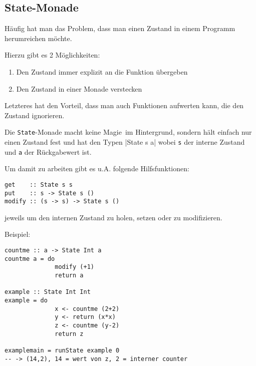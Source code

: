 \documentclass{beamer}
\begin{document}
\subsection{State-Monade}
\begin{frame}[fragile]
Häufig hat man das Problem, dass man einen Zustand in einem Programm herumreichen möchte.\bigskip

\pause
Hierzu gibt es 2 Möglichkeiten:
\begin{enumerate}
 \item Den Zustand immer explizit an die Funktion übergeben
 \item Den Zustand in einer Monade verstecken
\end{enumerate}
\pause
Letzteres hat den Vorteil, dass man auch Funktionen aufwerten kann, die den Zustand ignorieren.
\end{frame}

\begin{frame}[fragile]
Die \texttt{State}-Monade macht keine \glqq Magie\grqq \ im Hintergrund, sondern hält einfach nur einen Zustand fest und hat den Typen
|State s a|
wobei \texttt{s} der interne Zustand und \texttt{a} der Rückgabewert ist.\bigskip

\pause
Um damit zu arbeiten gibt es u.A. folgende Hilfsfunktionen:
\begin{verbatim}
get    :: State s s
put    :: s -> State s ()
modify :: (s -> s) -> State s ()
\end{verbatim}
jeweils um den internen Zustand zu holen, setzen oder zu modifizieren.
\end{frame}

\begin{frame}[fragile]
Beispiel:
\begin{verbatim}
countme :: a -> State Int a
countme a = do
              modify (+1)
              return a

example :: State Int Int
example = do
              x <- countme (2+2)
              y <- return (x*x)
              z <- countme (y-2)
              return z

examplemain = runState example 0
-- -> (14,2), 14 = wert von z, 2 = interner counter
\end{verbatim}
\end{frame}

\begin{comment}
\begin{frame}[fragile]
Beispiel 2:
\begin{verbatim}
data Spieler = X | O
data TicTacToeSpielfeld = Array (Int,Int) Spieler
data TicTacToe a = State TicTacToeSpielfeld a

macheSpielzug :: (Int, Int) -> Spieler -> TicTacToe ()
macheSpielzug pos s = modify ((flip (//)) [(pos,s)])

spielVorbei :: TicTacToe Bool
spielVorbei = do
                spielfeld <- get
                return (istVorbei spielfeld)
\end{verbatim}
\end{frame}
\end{comment}
\end{document}
